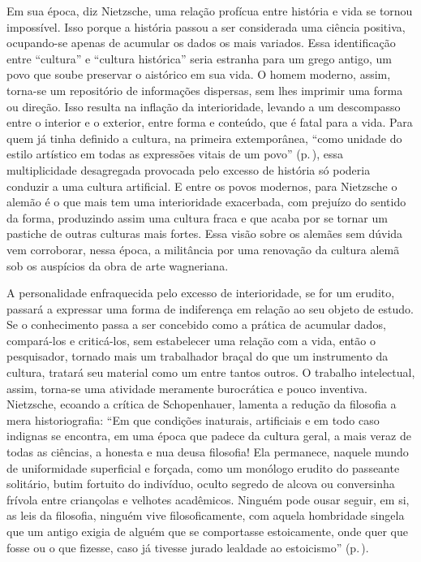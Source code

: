 Em sua época, diz Nietz\-sche, uma relação profícua entre história e vida
se tornou impossível. Isso porque a história passou a ser considerada
uma ciência positiva, ocupando-se apenas de acumular os dados os mais
variados. Essa identificação entre ``cultura'' e ``cultura histórica''
seria estranha para um grego antigo, um povo que soube preservar o
aistórico em sua vida. O homem moderno, assim, torna-se um repositório
de informações dispersas, sem lhes imprimir uma forma ou direção. Isso resulta na inflação da interioridade,
levando a um descompasso entre o interior e o exterior, entre forma e
conteúdo, que é fatal para a vida. Para quem já tinha definido a
cultura, na primeira extemporânea, ``como unidade do estilo artístico em
todas as expressões vitais de um povo'' (p.\,\pageref{vitaisdeumpovo}), essa multiplicidade
desagregada provocada pelo excesso de história só poderia conduzir a uma
cultura artificial. E entre os povos modernos, para Nietz\-sche o alemão é
o que mais tem uma interioridade exacerbada, com prejuízo do sentido da
forma, produzindo assim uma cultura fraca e que acaba por se tornar um
pastiche de outras culturas mais fortes. Essa visão sobre os alemães sem
dúvida vem corroborar, nessa época, a militância por uma renovação da
cultura alemã sob os auspícios da obra de arte wagneriana.

A personalidade enfraquecida pelo excesso de interioridade, se for um
erudito, passará a expressar uma forma de indiferença em relação ao seu
objeto de estudo. Se o conhecimento passa a ser concebido como a prática
de acumular dados, compará-los e criticá-los, sem estabelecer uma
relação com a vida, então o pesquisador, tornado mais um trabalhador
braçal do que um instrumento da cultura, tratará seu material como um
entre tantos outros. O trabalho intelectual, assim, torna-se uma
atividade meramente burocrática e pouco inventiva. Nietz\-sche, ecoando a
crítica de Schopenhauer, lamenta a redução da filosofia a mera historiografia: 
``Em que condições inaturais, artificiais e em todo caso
indignas se encontra, em uma época que padece da cultura geral, a mais
veraz de todas as ciências, a honesta e nua deusa filosofia! Ela
permanece, naquele mundo de uniformidade superficial e forçada, como um
monólogo erudito do passeante solitário, butim fortuito do indivíduo,
oculto segredo de alcova ou conversinha frívola entre criançolas e
velhotes acadêmicos. Ninguém pode ousar seguir, em si, as leis da
filosofia, ninguém vive filosoficamente, com aquela hombridade singela
que um antigo exigia de alguém que se comportasse estoicamente, onde
quer que fosse ou o que fizesse, caso já tivesse jurado lealdade ao
estoicismo'' (p.\,\pageref{lealdadeaoestoicismo}).


